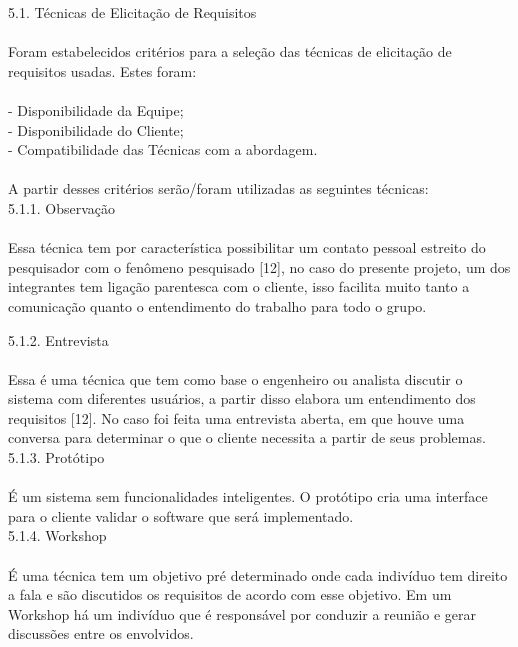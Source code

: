 {{\large{5.1. Técnicas de Elicitação de Requisitos}}\\ \\
\tab Foram estabelecidos critérios para a seleção das técnicas de elicitação de requisitos usadas. Estes foram:\\ \\
\tab - Disponibilidade da Equipe;\\
\tab - Disponibilidade do Cliente;\\
\tab - Compatibilidade das Técnicas com a abordagem.\\ \\
\tab A partir desses critérios serão/foram utilizadas as seguintes técnicas:\\

{\large{5.1.1. Observação}}\\ \\
\tab Essa técnica tem por característica possibilitar um contato pessoal estreito do pesquisador com o fenômeno pesquisado [12], no caso do presente projeto, um dos integrantes tem ligação parentesca com o cliente, isso facilita muito tanto a comunicação quanto o entendimento do trabalho para todo o grupo.\\

{\large{5.1.2. Entrevista}\\ \\
\tab Essa é uma técnica que tem como base o engenheiro ou analista discutir o sistema com diferentes usuários, a partir disso elabora um entendimento dos requisitos [12]. No caso foi feita uma entrevista aberta, em que houve uma conversa para determinar o que o cliente necessita a partir de seus problemas.\\

{\large{5.1.3. Protótipo}}\\ \\
\tab É um sistema sem funcionalidades inteligentes. O protótipo cria uma interface para o cliente validar o software que será implementado.\\

{\large{5.1.4. Workshop}}\\ \\
\tab É uma técnica tem um objetivo pré determinado onde cada indivíduo tem direito a fala e são discutidos os requisitos de acordo com esse objetivo. Em um Workshop há um indivíduo que é responsável por conduzir a reunião e gerar discussões entre os envolvidos.\\

\label{sec:nova_sess_o}

}}
